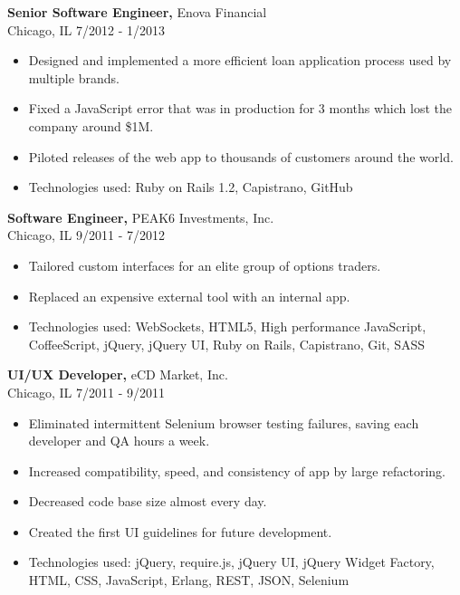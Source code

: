 \documentclass[margin]{res}
\begin{document}
\begin{resume}
{\bf Senior Software Engineer,} Enova Financial\\ Chicago, IL \hfill 7/2012 - 1/2013
\begin{itemize} \itemsep -2pt  %
\item Designed and implemented a more efficient loan application process used by multiple brands.
\item Fixed a JavaScript error that was in production for 3 months which lost the company around \$1M.
\item Piloted releases of the web app to thousands of customers around the world.
\item Technologies used: Ruby on Rails 1.2, Capistrano, GitHub
\end{itemize}

{\bf Software Engineer,} PEAK6 Investments, Inc.\\ Chicago, IL \hfill 9/2011 - 7/2012
\begin{itemize} \itemsep -2pt  %
\item Tailored custom interfaces for an elite group of options traders.
\item Replaced an expensive external tool with an internal app.
\item Technologies used: WebSockets, HTML5, High performance JavaScript, CoffeeScript, jQuery, jQuery UI, Ruby on Rails, Capistrano, Git, SASS
\end{itemize}

{\bf UI/UX Developer,} eCD Market, Inc.\\ Chicago, IL \hfill 7/2011 - 9/2011
\begin{itemize} \itemsep -2pt  %
\item Eliminated intermittent Selenium browser testing failures, saving each developer and QA hours a week.
\item Increased compatibility, speed, and consistency of app by large refactoring.
\item Decreased code base size almost every day.
\item Created the first UI guidelines for future development.
\item Technologies used: jQuery, require.js, jQuery UI, jQuery Widget Factory, HTML, CSS, JavaScript, Erlang, REST, JSON, Selenium
\end{itemize}


\end{resume}
\end{document}
